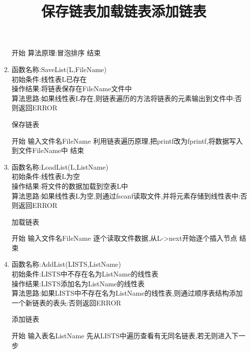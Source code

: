 \documentclass[supercite]{HustGraduPaper}
\theoremstyle{definition}
\begin{document}
\begin{enumerate}
\begin{algorithm}[htb]
\begin{algorithmic}[1]
			      \State 开始
			      \State 算法原理:冒泡排序
			      \State 结束
		      \end{algorithmic}\label{L15}
	      \end{algorithm}
	\item 函数名称:SaveList(L,FileName)\\
	      初始条件:线性表L已存在\\
	      操作结果:将链表保存在FileName文件中\\
	      算法思路:如果线性表L存在,则链表遍历的方法将链表的元素输出到文件中:否则返回ERROR
	      \begin{algorithm}[htb]
		      \title{保存链表}
		      \caption{保存链表}
		      \begin{algorithmic}[1]
			      \State 开始
			      \State 输入文件名FileName
			      \State 利用链表遍历原理,把printf改为fprintf,将数据写入到文件FileName中
			      \State 结束
		      \end{algorithmic}\label{L16}
	      \end{algorithm}
	      \newpage
	\item 函数名称:LoadList(L,ListName)\\
	      初始条件:线性表L为空\\
	      操作结果:将文件的数据加载到空表L中\\
	      算法思路:如果线性表L为空,则通过fscanf读取文件,并将元素存储到线性表中:否则返回ERROR
	      \begin{algorithm}[htb]
		      \title{加载链表}
		      \caption{加载链表}
		      \begin{algorithmic}[1]
			      \State 开始
			      \State 输入文件名FileName
			      \State 逐个读取文件数据,从L->next开始逐个插入节点
			      \State 结束
		      \end{algorithmic}\label{L17}
	      \end{algorithm}
	\item 函数名称:AddList(LISTS,ListName)\\
	      初始条件:LISTS中不存在名为ListName的线性表\\
	      操作结果:LISTS添加名为ListName的线性表\\
	      算法思路:如果LISTS中不存在名为ListName的线性表,则通过顺序表结构添加一个新链表的表头:否则返回ERROR
	      \begin{algorithm}[htb]
		      \title{添加链表}
		      \caption{添加链表}
		      \begin{algorithmic}[1]
			      \State 开始
			      \State 输入表名ListName
			      \State 先从LISTS中遍历查看有无同名链表,若无则进入下一步

\end{algorithmic}
\end{algorithm}
\end{enumerate}
\end{document}
